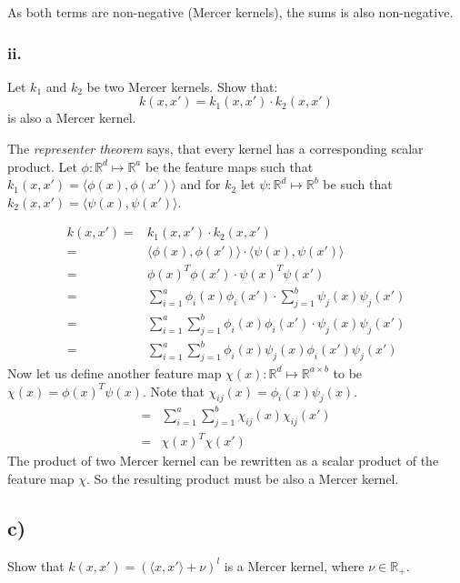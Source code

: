 \documentclass{article}
\newcommand{\R}[0]{\mathbb{R}}
\begin{document}
As both terms are non-negative (Mercer kernels), the sums is also non-negative.

\subsubsection*{ii.}

Let $k_1$ and $k_2$ be two Mercer kernels. Show that:
\begin{equation}
    k(x, x') = k_1(x, x') \cdot k_2(x, x')
\end{equation}
is also a Mercer kernel.


The \emph{representer theorem} says, that every kernel has a corresponding
scalar product.
Let $\phi : \R^d \mapsto \R^a $ be the feature maps such that $k_1(x, x') = \langle{}\phi(x),\phi(x')\rangle{}$ and
for $k_2$ let  $\psi : \R^d \mapsto \R^b$ be such that $k_2(x, x') = \langle{}\psi(x),\psi(x')\rangle{}$.

\begin{align}
    k(x, x') = &k_1(x, x') \cdot k_2(x, x')\\
    = & \langle{}\phi(x), \phi(x')\rangle{} \cdot \langle{}\psi(x), \psi(x')\rangle{}\\
    = & \phi(x)^T \phi(x') \cdot \psi(x)^T \psi(x')\\
    = & \sum_{i=1}^a \phi_i(x) \phi_i(x') \cdot \sum_{j=1}^b \psi_j(x) \psi_j(x')\\
    = & \sum_{i=1}^a \sum_{j=1}^b \phi_i(x) \phi_i(x') \cdot  \psi_j(x) \psi_j(x')\\
    = & \sum_{i=1}^a \sum_{j=1}^b \phi_i(x)  \psi_j(x) \phi_i(x') \psi_j(x')
\end{align}
Now let us define another feature map
$\chi(x) : \R^d \mapsto \R^{a \times b}$ to be $\chi(x) = \phi(x)^T \psi(x)$.
Note that $\chi_{ij}(x) = \phi_i(x) \psi_j(x)$.
\begin{align}
    = & \sum_{i=1}^a \sum_{j=1}^b \chi_{ij}(x)  \chi_{ij}(x') \\
    = & \chi(x)^T  \chi(x')
\end{align}
The product of two Mercer kernel can be rewritten as a scalar product of
the feature map $\chi$. So the resulting product must be also a Mercer kernel.

\subsection*{c)}

Show that $ k(x, x') = (\langle{}x, x'\rangle{} + \nu)^l$ is a Mercer kernel, where $\nu \in \R_+$.
\end{document}
